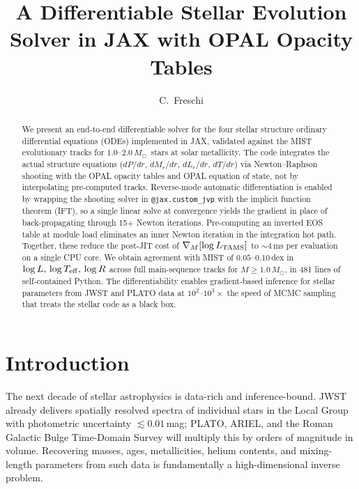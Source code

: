\documentclass[twocolumn]{aastex631}
\newcommand{\Msun}{\ensuremath{M_\odot}}
\newcommand{\Teff}{\ensuremath{T_{\rm eff}}}
\newcommand{\code}[1]{\texttt{#1}}
\begin{document}
\title{A Differentiable Stellar Evolution Solver in JAX with OPAL Opacity Tables}

\author[0000-0000-0000-0000]{C.~Freschi}

\begin{abstract}
We present an end-to-end differentiable solver for the four stellar structure
ordinary differential equations (ODEs) implemented in JAX, validated against
the MIST evolutionary tracks for $1.0$--$2.0\,$\Msun\ stars at solar metallicity.
The code integrates the actual structure equations
($dP/dr,\,dM_r/dr,\,dL_r/dr,\,dT/dr$) via Newton--Raphson shooting with the
OPAL opacity tables \citep{1996ApJ...464..943I} and OPAL equation of state,
not by interpolating pre-computed tracks. Reverse-mode automatic
differentiation is enabled by wrapping the shooting solver in
\code{@jax.custom\_jvp} with the implicit function theorem (IFT), so a single
linear solve at convergence yields the gradient in place of back-propagating
through 15+ Newton iterations. Pre-computing an inverted EOS table at module
load eliminates an inner Newton iteration in the integration hot path.
Together, these reduce the post-JIT cost of
$\nabla_M [\log L_{\rm TAMS}]$
to $\sim 4\,$ms per evaluation on a single CPU core. We obtain agreement with
MIST of $0.05$--$0.10\,$dex in $\log L,\,\log\Teff,\,\log R$ across full
main-sequence tracks for $M \geq 1.0\,$\Msun, in 481 lines of self-contained
Python. The differentiability enables gradient-based inference for stellar
parameters from JWST and PLATO data at $10^2$--$10^3 \times$ the speed of MCMC
sampling that treats the stellar code as a black box.
\end{abstract}


\section{Introduction}

The next decade of stellar astrophysics is data-rich and
inference-bound. JWST already delivers spatially resolved spectra of
individual stars in the Local Group with photometric uncertainty
$\lesssim 0.01\,$mag; PLATO, ARIEL, and the Roman Galactic Bulge
Time-Domain Survey will multiply this by orders of magnitude in volume.
Recovering masses, ages, metallicities, helium contents, and mixing-length
parameters from such data is fundamentally a high-dimensional inverse
problem.
\end{document}
